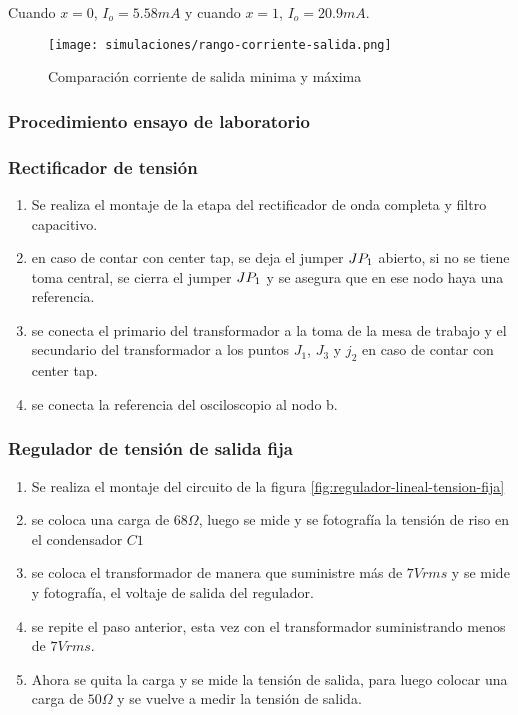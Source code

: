Cuando $x=0$, $I_o = 5.58 mA$ y cuando $x=1$, $I_o = 20.9mA$.

\begin{figure}[ht]
    \centering
    \texttt{[image: simulaciones/rango-corriente-salida.png]}
    \caption{Comparación corriente de salida minima y máxima}
    \label{fig:rango-corriente-salida}
\end{figure}

\subsubsection{Procedimiento ensayo de laboratorio}

\subsubsection*{Rectificador de tensión}

\begin{enumerate}
    \item Se realiza el montaje de la etapa del rectificador de onda completa y filtro capacitivo.
    \item en caso de contar con center tap, se deja el jumper $JP_{1}$ abierto, si no se tiene toma central, se cierra el jumper $JP_{1}$ y se asegura que en ese nodo haya una referencia.
    \item se conecta el primario del transformador a la toma de la mesa de trabajo y el secundario del transformador a los puntos $J_1$, $J_3$ y $j_2$ en caso de contar con center tap.
    \item se conecta la referencia del osciloscopio al nodo b.
\end{enumerate}

\subsubsection*{Regulador de tensión de salida fija}

\begin{enumerate}
    \item Se realiza el montaje del circuito de la figura \ref{fig:regulador-lineal-tension-fija}
    \item se coloca una carga de $68 \Omega$, luego se mide y se fotografía la tensión de riso en el condensador $C1$ 
    \item se coloca el transformador de manera que suministre más de $7Vrms$ y se mide y fotografía, el voltaje de salida del regulador.
    \item se repite el paso anterior, esta vez con el transformador suministrando menos de $7Vrms$.
    \item Ahora se quita la carga y se mide la tensión de salida, para luego colocar una carga de $50 \Omega$ y se vuelve a medir la tensión de salida.
\end{enumerate}

